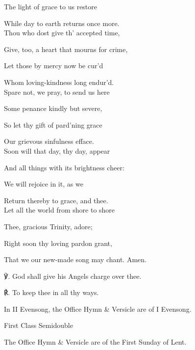 \begin{paracol}{2}[]
\begin{hangparas}{1.25em}{1}
The light of grace to us restore

While day to earth returns once more.\\

Thou who dost give th' accepted time,

Give, too, a heart that mourns for crime,

Let those by mercy now be cur'd

Whom loving-kindness long endur'd.\\

Spare not, we pray, to send us here

Some penance kindly but severe,

So let thy gift of pard'ning grace

Our grievous sinfulness efface.\\

Soon will that day, thy day, appear

And all things with its brightness cheer:

We will rejoice in it, as we

Return thereby to grace, and thee.\\

Let all the world from shore to shore

Thee, gracious Trinity, adore;

Right soon thy loving pardon grant,

That we our new-made song may chant. Amen.\\

\end{hangparas}

℣. God shall give his Angels charge over thee.

℟. To keep thee in all thy ways.

\fussy
\end{paracol}

\begin{rubric}
	In II Evensong, the Office Hymn \& Versicle are of I Evensong.
\end{rubric}

\fancyhead[RE,LO]{}
\begin{inhead}
    {First Class Semidouble}
\end{inhead}

\begin{rubric}
	The Office Hymn \& Versicle are of the First Sunday of Lent.
\end{rubric}



